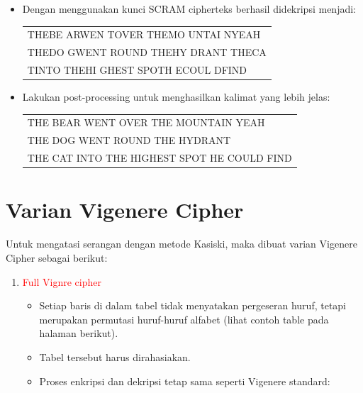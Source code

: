 \documentclass{article}
\begin{document}
\newpage


\begin{itemize}
    \item Dengan menggunakan kunci SCRAM cipherteks berhasil didekripsi menjadi:
    
    \begin{center}
    \begin{tabular}{l}
    THEBE ARWEN TOVER THEMO UNTAI NYEAH \\
    THEDO GWENT ROUND THEHY DRANT THECA \\
    TINTO THEHI GHEST SPOTH ECOUL DFIND
    \end{tabular}
    \end{center}
    
    \item Lakukan post-processing untuk menghasilkan kalimat yang lebih jelas:
    
    \begin{center}
    \begin{tabular}{l}
    THE BEAR WENT OVER THE MOUNTAIN YEAH \\
    THE DOG WENT ROUND THE HYDRANT \\
    THE CAT INTO THE HIGHEST SPOT HE COULD FIND
    \end{tabular}
    \end{center}
\end{itemize}

\newpage


\section*{Varian Vigenere Cipher}

Untuk mengatasi serangan dengan metode Kasiski, maka dibuat varian Vigenere Cipher sebagai berikut:

\begin{enumerate}
    \item \textcolor{red}{Full Vignre cipher}
    \begin{itemize}
        \item Setiap baris di dalam tabel tidak menyatakan pergeseran huruf, tetapi merupakan permutasi huruf-huruf alfabet (lihat contoh table pada halaman berikut).
        \item Tabel tersebut harus dirahasiakan.
        \item Proses enkripsi dan dekripsi tetap sama seperti Vigenere standard:
    \end{itemize}
\end{enumerate}
\end{document}

